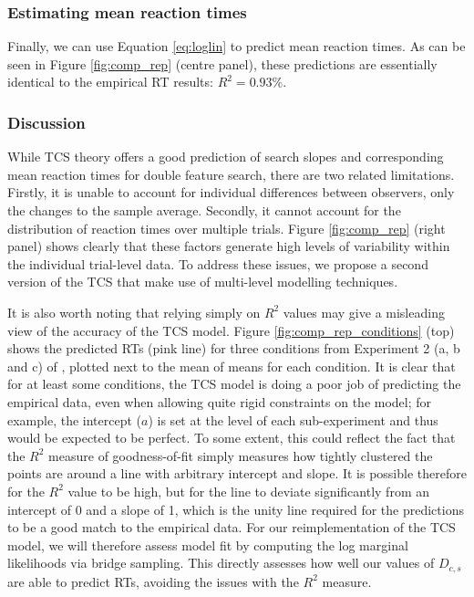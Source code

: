 \documentclass[smallextended, natbib]{svjour3}       %
\begin{document}
\subsubsection{Estimating mean reaction times}

Finally, we can use Equation \ref{eq:loglin} to predict mean reaction times. As can be seen in  Figure \ref{fig:comp_rep} (centre panel), these predictions are essentially identical to the empirical RT results: $R^2 = 0.93\%$.

\subsubsection{Discussion}

While TCS theory offers a good prediction of search slopes and corresponding mean reaction times for double feature search, there are two related limitations. Firstly, it is unable to account for individual differences between observers, only the changes to the sample average. Secondly, it cannot account for the distribution of reaction times over multiple trials. Figure \ref{fig:comp_rep} (right panel) shows clearly that these factors generate high levels of variability within the individual trial-level data. To address these issues, we propose a second version of the TCS that make use of multi-level modelling techniques.

It is also worth noting that relying simply on $R^2$ values may give a misleading view of the accuracy of the TCS model. Figure \ref{fig:comp_rep_conditions} (top) shows the predicted RTs (pink line) for three conditions from Experiment 2 (a, b and c) of \cite{buetti2019predicting}, plotted next to the mean of means for each condition. It is clear that for at least some conditions, the TCS model is doing a poor job of predicting the empirical data, even when allowing quite rigid constraints on the model; for example, the intercept ($a$) is set at the level of each sub-experiment and thus would be expected to be perfect. To some extent, this could reflect the fact that the $R^2$ measure of goodness-of-fit simply measures how tightly clustered the points are around a line with arbitrary intercept and slope. It is possible therefore for the $R^2$ value to be high, but for the line to deviate significantly from an intercept of 0 and a slope of 1, which is the unity line required for the predictions to be a good match to the empirical data. For our reimplementation of the TCS model, we will therefore assess model fit by computing the log marginal likelihoods via bridge sampling. This directly assesses how well our values of $D_{c,s}$ are able to predict RTs, avoiding the issues with the $R^2$ measure.
\end{document}
